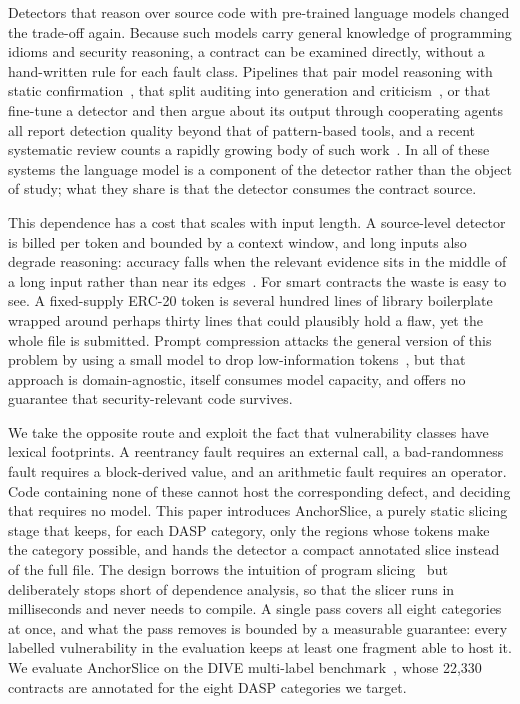 \documentclass{ieeeaccess}
\begin{document}
Detectors that reason over source code with pre-trained language models changed the trade-off again. Because such models carry general knowledge of programming idioms and security reasoning, a contract can be examined directly, without a hand-written rule for each fault class. Pipelines that pair model reasoning with static confirmation~\cite{sun2024gptscan}, that split auditing into generation and criticism~\cite{hu2023gptlens}, or that fine-tune a detector and then argue about its output through cooperating agents~\cite{ma2025iaudit} all report detection quality beyond that of pattern-based tools, and a recent systematic review counts a rapidly growing body of such work~\cite{he2024review}. In all of these systems the language model is a component of the detector rather than the object of study; what they share is that the detector consumes the contract source.

This dependence has a cost that scales with input length. A source-level detector is billed per token and bounded by a context window, and long inputs also degrade reasoning: accuracy falls when the relevant evidence sits in the middle of a long input rather than near its edges~\cite{liu2024lost}. For smart contracts the waste is easy to see. A fixed-supply ERC-20 token is several hundred lines of library boilerplate wrapped around perhaps thirty lines that could plausibly hold a flaw, yet the whole file is submitted. Prompt compression attacks the general version of this problem by using a small model to drop low-information tokens~\cite{jiang2023llmlingua}, but that approach is domain-agnostic, itself consumes model capacity, and offers no guarantee that security-relevant code survives.

We take the opposite route and exploit the fact that vulnerability classes have lexical footprints. A reentrancy fault requires an external call, a bad-randomness fault requires a block-derived value, and an arithmetic fault requires an operator. Code containing none of these cannot host the corresponding defect, and deciding that requires no model. This paper introduces AnchorSlice, a purely static slicing stage that keeps, for each DASP category, only the regions whose tokens make the category possible, and hands the detector a compact annotated slice instead of the full file. The design borrows the intuition of program slicing~\cite{weiser1981} but deliberately stops short of dependence analysis, so that the slicer runs in milliseconds and never needs to compile. A single pass covers all eight categories at once, and what the pass removes is bounded by a measurable guarantee: every labelled vulnerability in the evaluation keeps at least one fragment able to host it. We evaluate AnchorSlice on the DIVE multi-label benchmark~\cite{dive2026}, whose 22,330 contracts are annotated for the eight DASP categories we target.
\end{document}
